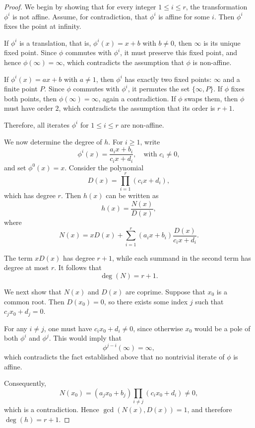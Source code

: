 \documentclass[1p,final]{elsarticle}
\newtheorem{open problem}[theorem]{Open Problem}
\begin{document}
\begin{proof}

We begin by showing that for every integer $1 \leq i \leq r$, the transformation $\phi^i$ is not affine. Assume, for contradiction, that $\phi^i$ is affine for some $i$. Then $\phi^i$ fixes the point at infinity. 

If $\phi^i$ is a translation, that is, $\phi^i(x)=x+b$ with $b\neq 0$, then $\infty$ is its unique fixed point. Since $\phi$ commutes with $\phi^i$, it must preserve this fixed point, and hence $\phi(\infty)=\infty$, which contradicts the assumption that $\phi$ is non-affine.

If $\phi^i(x)=ax+b$ with $a\neq 1$, then $\phi^i$ has exactly two fixed points: $\infty$ and a finite point $P$. Since $\phi$ commutes with $\phi^i$, it permutes the set $\{\infty,P\}$. If $\phi$ fixes both points, then $\phi(\infty)=\infty$, again a contradiction. If $\phi$ swaps them, then $\phi$ must have order $2$, which contradicts the assumption that its order is $r+1$. 

Therefore, all iterates $\phi^i$ for $1 \le i \le r$ are non-affine.

\medskip

We now determine the degree of $h$. For $i \geq 1$, write
\[
\phi^i(x)=\frac{a_i x+b_i}{c_i x+d_i}, \quad \text{with } c_i \neq 0,
\]
and set $\phi^0(x)=x$. Consider the polynomial
\[
D(x)=\prod_{i=1}^r (c_i x+d_i),
\]
which has degree $r$. Then $h(x)$ can be written as
\[
h(x)=\frac{N(x)}{D(x)},
\]
where
\[
N(x)=xD(x)+\sum_{i=1}^r (a_i x+b_i)\frac{D(x)}{c_i x+d_i}.
\]

The term $xD(x)$ has degree $r+1$, while each summand in the second term has degree at most $r$. It follows that
\[
\deg(N)=r+1.
\]

\medskip

We next show that $N(x)$ and $D(x)$ are coprime. Suppose that $x_0$ is a common root. Then $D(x_0)=0$, so there exists some index $j$ such that $c_j x_0+d_j=0$. 

For any $i\neq j$, one must have $c_i x_0+d_i\neq 0$, since otherwise $x_0$ would be a pole of both $\phi^i$ and $\phi^j$. This would imply that
\[
\phi^{j-i}(\infty)=\infty,
\]
which contradicts the fact established above that no nontrivial iterate of $\phi$ is affine.

Consequently,
\[
N(x_0)=(a_j x_0+b_j)\prod_{i\ne j}(c_i x_0+d_i)\neq 0,
\]
which is a contradiction. Hence $\gcd(N(x),D(x))=1$, and therefore $\deg(h)=r+1$.

\medskip


\end{proof}
\end{document}

